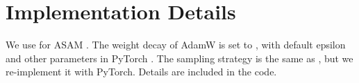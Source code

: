 \documentclass[10pt,twocolumn,letterpaper]{article}
\begin{document}
\section{Implementation Details}
\label{sec:detail}
We use  for ASAM \cite{ASAM}. The weight decay of AdamW is set to , with default epsilon and other parameters in PyTorch \cite{paszke2019pytorch}. The sampling strategy is the same as \cite{zhu2021vigor}, but we re-implement it with PyTorch. Details are included in the code.
\end{document}
